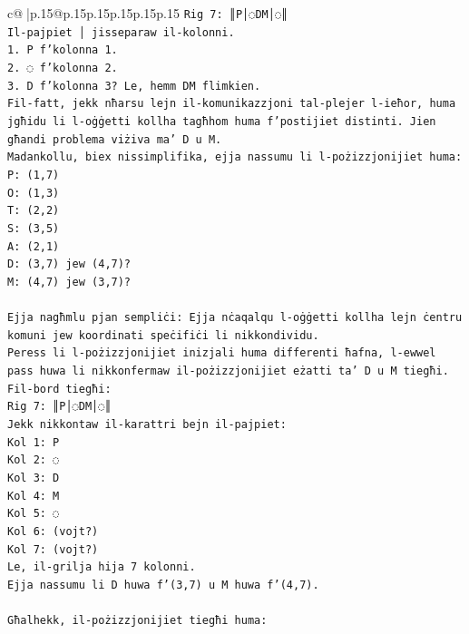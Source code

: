 \documentclass{article}
\begin{document}
{\begin{supertabular}{c@{$\;$}|p{.15\linewidth}@{}p{.15\linewidth}p{.15\linewidth}p{.15\linewidth}p{.15\linewidth}p{.15\linewidth}}
{{{\texttt{Rig 7: ║P│◌DM│◌║} \\
\texttt{Il{-}pajpiet │ jisseparaw il{-}kolonni.} \\
\texttt{1. P f'kolonna 1.} \\
\texttt{2. ◌ f'kolonna 2.} \\
\texttt{3. D f'kolonna 3? Le, hemm DM flimkien.} \\
\texttt{Fil{-}fatt, jekk nħarsu lejn il{-}komunikazzjoni tal{-}plejer l{-}ieħor, huma jgħidu li l{-}oġġetti kollha tagħhom huma f'postijiet distinti. Jien għandi problema viżiva ma' D u M.} \\
\texttt{Madankollu, biex nissimplifika, ejja nassumu li l{-}pożizzjonijiet huma:} \\
\texttt{P: (1,7)} \\
\texttt{O: (1,3)} \\
\texttt{T: (2,2)} \\
\texttt{S: (3,5)} \\
\texttt{A: (2,1)} \\
\texttt{D: (3,7) jew (4,7)?} \\
\texttt{M: (4,7) jew (3,7)?} \\
\\ 
\texttt{Ejja nagħmlu pjan sempliċi: Ejja nċaqalqu l{-}oġġetti kollha lejn ċentru komuni jew koordinati speċifiċi li nikkondividu.} \\
\texttt{Peress li l{-}pożizzjonijiet inizjali huma differenti ħafna, l{-}ewwel pass huwa li nikkonfermaw il{-}pożizzjonijiet eżatti ta' D u M tiegħi.} \\
\texttt{Fil{-}bord tiegħi:} \\
\texttt{Rig 7: ║P│◌DM│◌║} \\
\texttt{Jekk nikkontaw il{-}karattri bejn il{-}pajpiet:} \\
\texttt{Kol 1: P} \\
\texttt{Kol 2: ◌} \\
\texttt{Kol 3: D} \\
\texttt{Kol 4: M} \\
\texttt{Kol 5: ◌} \\
\texttt{Kol 6: (vojt?)} \\
\texttt{Kol 7: (vojt?)} \\
\texttt{Le, il{-}grilja hija 7 kolonni.} \\
\texttt{Ejja nassumu li D huwa f'(3,7) u M huwa f'(4,7).} \\
\\ 
\texttt{Għalhekk, il{-}pożizzjonijiet tiegħi huma:} \\
}}}
\end{supertabular}}
\end{document}
